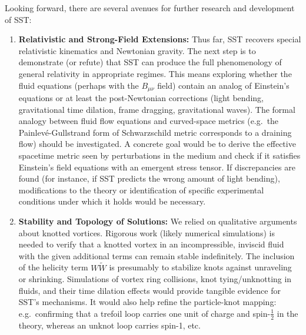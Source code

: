 \documentclass[10pt,reprint,aps,onecolumn,nofootinbib]{revtex4-2}
\begin{document}
Looking forward, there are several avenues for further research and development of SST:
\begin{enumerate}
    \item \textbf{Relativistic and Strong-Field Extensions:} Thus far, SST recovers special relativistic kinematics and Newtonian gravity. The next step is to demonstrate (or refute) that SST can produce the full phenomenology of general relativity in appropriate regimes. This means exploring whether the fluid equations (perhaps with the $B_{\mu\nu}$ field) contain an analog of Einstein’s equations or at least the post-Newtonian corrections (light bending, gravitational time dilation, frame dragging, gravitational waves). The formal analogy between fluid flow equations and curved-space metrics (e.g.\ the Painlevé-Gullstrand form of Schwarzschild metric corresponds to a draining flow) should be investigated. A concrete goal would be to derive the effective spacetime metric seen by perturbations in the medium and check if it satisfies Einstein’s field equations with an emergent stress tensor. If discrepancies are found (for instance, if SST predicts the wrong amount of light bending), modifications to the theory or identification of specific experimental conditions under which it holds would be necessary.
    \item \textbf{Stability and Topology of Solutions:} We relied on qualitative arguments about knotted vortices. Rigorous work (likely numerical simulations) is needed to verify that a knotted vortex in an incompressible, inviscid fluid with the given additional terms can remain stable indefinitely. The inclusion of the helicity term $W\tilde{W}$ is presumably to stabilize knots against unraveling or shrinking. Simulations of vortex ring collisions, knot tying/unknotting in fluids, and their time dilation effects would provide tangible evidence for SST’s mechanisms. It would also help refine the particle-knot mapping: e.g.\ confirming that a trefoil loop carries one unit of charge and spin-$\frac{1}{2}$ in the theory, whereas an unknot loop carries spin-1, etc.

\end{enumerate}
\end{document}
